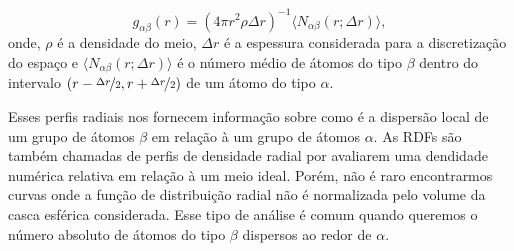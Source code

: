 \begin{equation}
g_{\alpha\beta}(r) = (4\pi r^2\rho\Delta r)^{-1} \langle N_{\alpha\beta}(r; \Delta r) \rangle ,
\end{equation}
onde, $\rho$ é a densidade do meio, $\Delta r$ é a espessura considerada para a discretização do espaço e $\langle N_{\alpha \beta}(r;\Delta r) \rangle$ é o número médio de átomos do tipo $\beta$ dentro do intervalo $(r-\nicefrac{\Delta r}{2}, r+\nicefrac{\Delta r}{2})$ de um átomo do tipo $\alpha$.

Esses perfis radiais nos fornecem informação sobre como é a dispersão local de um grupo de átomos $\beta$ em relação à um grupo de átomos $\alpha$. 
As RDFs são também chamadas de perfis de densidade radial por avaliarem uma dendidade numérica relativa em relação à um meio ideal. Porém, não é raro encontrarmos curvas onde a função de distribuição radial não é normalizada pelo volume da casca esférica considerada. 
Esse tipo de análise é comum quando queremos o número absoluto de átomos do tipo $\beta$ dispersos ao redor de $\alpha$.
